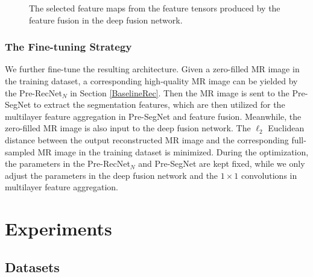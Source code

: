 \documentclass[runningheads]{llncs}
\begin{document}
\begin{figure}[htb!]
\begin{center}
   \caption{The selected feature maps from the feature tensors produced by the feature fusion in the deep fusion network.}
\label{fig3}
\end{center}
\end{figure}

\vspace{-10mm}

\subsubsection{The Fine-tuning Strategy}
\label{TheFineTune}

We further fine-tune the resulting architecture. Given a zero-filled MR image in the training dataset, a corresponding high-quality MR image can be yielded by the Pre-RecNet$_N$ in Section \ref{BaselineRec}. Then the MR image is sent to the Pre-SegNet to extract the segmentation features, which are then utilized for the multilayer feature aggregation in Pre-SegNet and feature fusion. Meanwhile, the zero-filled MR image is also input to the deep fusion network. The $\ell_2$ Euclidean distance between the output reconstructed MR image and the corresponding full-sampled MR image in the training dataset is minimized. During the optimization, the parameters in the Pre-RecNet$_N$ and Pre-SegNet are kept fixed, while we only adjust the parameters in the deep fusion network and the $1\times1$ convolutions in multilayer feature aggregation.

\vspace{-2mm}

\section{Experiments}

\subsection{Datasets}
\end{document}
